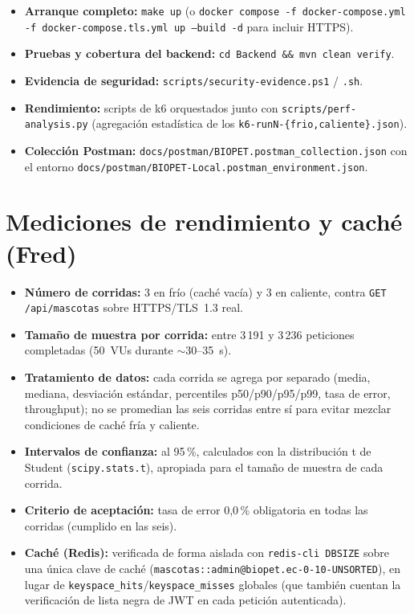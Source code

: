 \begin{itemize}[nosep]
  \item \textbf{Arranque completo:} \texttt{make up} (o
    \texttt{docker compose -f docker-compose.yml -f docker-compose.tls.yml up --build -d}
    para incluir HTTPS).
  \item \textbf{Pruebas y cobertura del backend:} \texttt{cd Backend \&\& mvn clean verify}.
  \item \textbf{Evidencia de seguridad:}
    \texttt{scripts/security-evidence.ps1} / \texttt{.sh}.
  \item \textbf{Rendimiento:} scripts de k6 orquestados junto con
    \texttt{scripts/perf-analysis.py} (agregaci\'on estad\'istica de los
    \texttt{k6-runN-\{frio,caliente\}.json}).
  \item \textbf{Colecci\'on Postman:} \texttt{docs/postman/BIOPET.postman\_collection.json}
    con el entorno \texttt{docs/postman/BIOPET-Local.postman\_environment.json}.
\end{itemize}

\section{Mediciones de rendimiento y cach\'e (Fred)}

\begin{itemize}[nosep]
  \item \textbf{N\'umero de corridas:} 3 en fr\'io (cach\'e vac\'ia) y 3 en
    caliente, contra \texttt{GET /api/mascotas} sobre HTTPS/TLS~1.3 real.
  \item \textbf{Tama\~no de muestra por corrida:} entre 3\,191 y 3\,236
    peticiones completadas (50~VUs durante $\sim$30--35~s).
  \item \textbf{Tratamiento de datos:} cada corrida se agrega por separado
    (media, mediana, desviaci\'on est\'andar, percentiles p50/p90/p95/p99,
    tasa de error, throughput); no se promedian las seis corridas entre
    s\'i para evitar mezclar condiciones de cach\'e fr\'ia y caliente.
  \item \textbf{Intervalos de confianza:} al 95\,\%, calculados con la
    distribuci\'on t de Student (\texttt{scipy.stats.t}), apropiada para el
    tama\~no de muestra de cada corrida.
  \item \textbf{Criterio de aceptaci\'on:} tasa de error 0{,}0\,\% obligatoria
    en todas las corridas (cumplido en las seis).
  \item \textbf{Cach\'e (Redis):} verificada de forma aislada con
    \texttt{redis-cli DBSIZE} sobre una \'unica clave de cach\'e
    (\texttt{mascotas::admin@biopet.ec-0-10-UNSORTED}), en lugar de
    \texttt{keyspace_hits}/\texttt{keyspace_misses} globales (que tambi\'en
    cuentan la verificaci\'on de lista negra de JWT en cada petici\'on
    autenticada).
\end{itemize}

